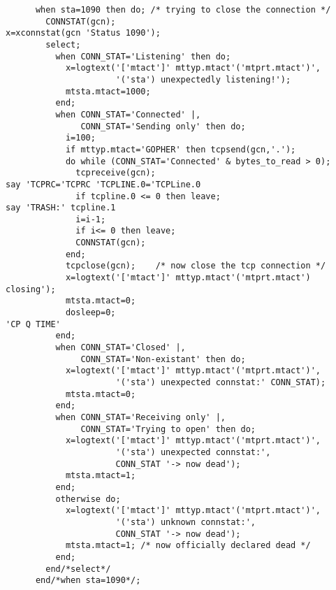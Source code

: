 \begin{verbatim}
      when sta=1090 then do; /* trying to close the connection */
        CONNSTAT(gcn);
x=xconnstat(gcn 'Status 1090');
        select;
          when CONN_STAT='Listening' then do;
            x=logtext('['mtact']' mttyp.mtact'('mtprt.mtact')',
                      '('sta') unexpectedly listening!');
            mtsta.mtact=1000;
          end;
          when CONN_STAT='Connected' |,
               CONN_STAT='Sending only' then do;
            i=100;
            if mttyp.mtact='GOPHER' then tcpsend(gcn,'.');
            do while (CONN_STAT='Connected' & bytes_to_read > 0);
              tcpreceive(gcn);
say 'TCPRC='TCPRC 'TCPLINE.0='TCPLine.0
              if tcpline.0 <= 0 then leave;
say 'TRASH:' tcpline.1
              i=i-1;
              if i<= 0 then leave;
              CONNSTAT(gcn);
            end;
            tcpclose(gcn);    /* now close the tcp connection */
            x=logtext('['mtact']' mttyp.mtact'('mtprt.mtact') closing');
            mtsta.mtact=0;
            dosleep=0;
'CP Q TIME'
          end;
          when CONN_STAT='Closed' |,
               CONN_STAT='Non-existant' then do;
            x=logtext('['mtact']' mttyp.mtact'('mtprt.mtact')',
                      '('sta') unexpected connstat:' CONN_STAT);
            mtsta.mtact=0;
          end;
          when CONN_STAT='Receiving only' |,
               CONN_STAT='Trying to open' then do;
            x=logtext('['mtact']' mttyp.mtact'('mtprt.mtact')',
                      '('sta') unexpected connstat:',
                      CONN_STAT '-> now dead');
            mtsta.mtact=1;
          end;
          otherwise do;
            x=logtext('['mtact']' mttyp.mtact'('mtprt.mtact')',
                      '('sta') unknown connstat:',
                      CONN_STAT '-> now dead');
            mtsta.mtact=1; /* now officially declared dead */
          end;
        end/*select*/
      end/*when sta=1090*/;


\end{verbatim}
